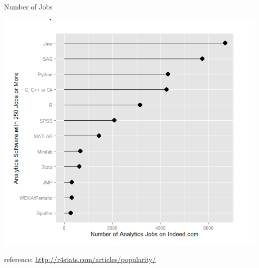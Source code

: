 \documentclass[11pt]{beamer}\usepackage[]{graphicx}\usepackage[]{color}
\begin{document}
\begin{frame}{Number of Jobs}

\begin{center}
\includegraphics[scale=0.7]{jobs.png}
\end{center}

\vspace{0.05in}

reference: \href{http://r4stats.com/articles/popularity/}{http://r4stats.com/articles/popularity/}\\

\end{frame}
\end{document}
